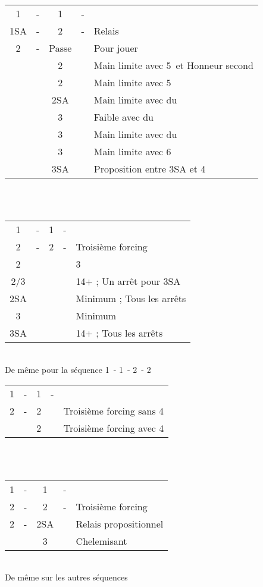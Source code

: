 \documentclass[a4paper, oneside, 11pt]{report}
\begin{document}
		\begin{tabular}{cccc|l}
		1\coeur & - & 1\pique & - &\\
		1SA & - & 2\trefle & - & Relais\\
		2\carreau & - & Passe && Pour jouer\\
		&& 2\coeur && Main limite avec 5\pique\ et Honneur second \coeur\\
		&& 2\pique && Main limite avec 5\pique\\
		&& 2SA && Main limite avec du \trefle\\
		&& 3\trefle && Faible avec du \trefle\\
		&& 3\carreau && Main limite avec du \carreau\\
		&& 3\pique && Main limite avec 6\pique\\
		&& 3SA && Proposition entre 3SA et 4\pique\\
		\end{tabular}\\\\
	
		\begin{tabular}{cccc|l}
		1\trefle & - & 1\coeur & - &\\
		2\trefle & - & 2\carreau & - & Troisième forcing\\
		2\coeur &&&& 3\coeur\\
		2\pique/3\carreau &&&& 14+ ; Un arrêt pour 3SA\\
		2SA &&&& Minimum ; Tous les arrêts\\
		3\trefle &&&& Minimum\\
		3SA &&&& 14+ ; Tous les arrêts\\
		\end{tabular}\\
		De même pour la séquence 1\carreau\ - 1\pique\ - 2\carreau\ - 2\coeur\\
			
		\begin{tabular}{cccc|l}
		1\trefle & - & 1\pique & - &\\
		2\trefle & - & 2\carreau && Troisième forcing sans 4\coeur\\
		&& 2\coeur && Troisième forcing avec 4\coeur\\
		\end{tabular}\\\\
			
		\begin{tabular}{cccc|l}
		1\trefle & - & 1\coeur & - &\\
		2\trefle & - & 2\carreau & - & Troisième forcing\\
		2\coeur & - & 2SA && Relais propositionnel\\
		&& 3\coeur &&Chelemisant\\
		\end{tabular}\\
		De même sur les autres séquences
\end{document}
